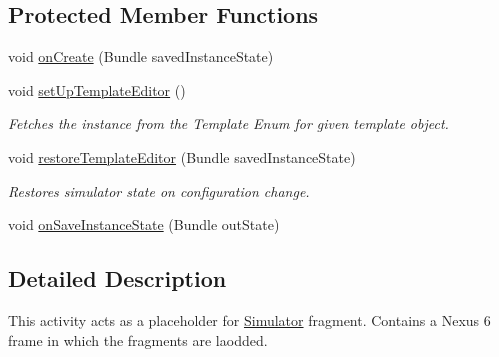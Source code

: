 \subsection*{Protected Member Functions}
\begin{DoxyCompactItemize}
\item 
void \hyperlink{classorg_1_1buildmlearn_1_1toolkit_1_1simulator_1_1Simulator_aa1564faa9391f86b07b713365af01ee8}{on\-Create} (Bundle saved\-Instance\-State)
\item 
void \hyperlink{classorg_1_1buildmlearn_1_1toolkit_1_1simulator_1_1Simulator_a7bcd184d22530dd1683487621e6dd5bf}{set\-Up\-Template\-Editor} ()
\begin{DoxyCompactList}\small\item\em Fetches the instance from the Template Enum for given template object. \end{DoxyCompactList}\item 
void \hyperlink{classorg_1_1buildmlearn_1_1toolkit_1_1simulator_1_1Simulator_a5df030ae2efb3c7cd3b2597867fceaf4}{restore\-Template\-Editor} (Bundle saved\-Instance\-State)
\begin{DoxyCompactList}\small\item\em Restores simulator state on configuration change. \end{DoxyCompactList}\item 
void \hyperlink{classorg_1_1buildmlearn_1_1toolkit_1_1simulator_1_1Simulator_a56b9664eb7326624e8933961d3e0c535}{on\-Save\-Instance\-State} (Bundle out\-State)
\end{DoxyCompactItemize}


\subsection{Detailed Description}
This activity acts as a placeholder for \hyperlink{classorg_1_1buildmlearn_1_1toolkit_1_1simulator_1_1Simulator}{Simulator} fragment. Contains a Nexus 6 frame in which the fragments are laodded. 

